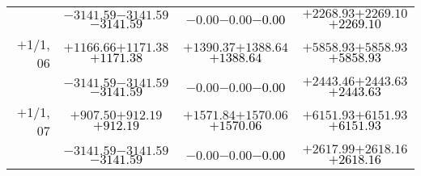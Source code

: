 \documentclass[compress]{beamer}
\begin{document}
\begin{frame}
{\begin{tabular}{r | c | c | c}
           & $-3141.59$\hspace{0.1 cm}$-3141.59$\hspace{0.1 cm}\textcolor{black}{$-3141.59$} & $-0.00$\hspace{0.1 cm}$-0.00$\hspace{0.1 cm}\textcolor{black}{$-0.00$} & $+2268.93$\hspace{0.1 cm}$+2269.10$\hspace{0.1 cm}\textcolor{black}{$+2269.10$} \\
$+$1/1, 06 & $+1166.66$\hspace{0.1 cm}$+1171.38$\hspace{0.1 cm}\textcolor{black}{$+1171.38$} & $+1390.37$\hspace{0.1 cm}$+1388.64$\hspace{0.1 cm}\textcolor{black}{$+1388.64$} & $+5858.93$\hspace{0.1 cm}$+5858.93$\hspace{0.1 cm}\textcolor{black}{$+5858.93$} \\
           & $-3141.59$\hspace{0.1 cm}$-3141.59$\hspace{0.1 cm}\textcolor{black}{$-3141.59$} & $-0.00$\hspace{0.1 cm}$-0.00$\hspace{0.1 cm}\textcolor{black}{$-0.00$} & $+2443.46$\hspace{0.1 cm}$+2443.63$\hspace{0.1 cm}\textcolor{black}{$+2443.63$} \\
$+$1/1, 07 & $+907.50$\hspace{0.1 cm}$+912.19$\hspace{0.1 cm}\textcolor{black}{$+912.19$} & $+1571.84$\hspace{0.1 cm}$+1570.06$\hspace{0.1 cm}\textcolor{black}{$+1570.06$} & $+6151.93$\hspace{0.1 cm}$+6151.93$\hspace{0.1 cm}\textcolor{black}{$+6151.93$} \\
           & $-3141.59$\hspace{0.1 cm}$-3141.59$\hspace{0.1 cm}\textcolor{black}{$-3141.59$} & $-0.00$\hspace{0.1 cm}$-0.00$\hspace{0.1 cm}\textcolor{black}{$-0.00$} & $+2617.99$\hspace{0.1 cm}$+2618.16$\hspace{0.1 cm}\textcolor{black}{$+2618.16$} \\

\end{tabular}}
\end{frame}
\end{document}

